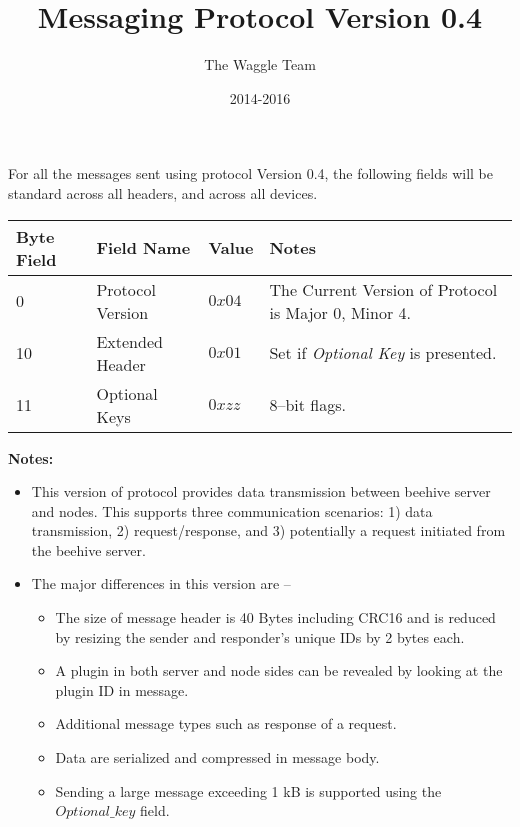 \documentclass[11pt,letter]{article}
\begin{document}
\title{Messaging Protocol Version 0.4}
\author{The Waggle Team}
\date{2014-2016}
\maketitle
\noindent
For all the messages sent using protocol Version 0.4, the following fields will be standard across
all headers, and across all devices.
\begin{center}
    \begin{tabular}{ | l | l | p{3cm} | p{5cm} |}
    \hline
    \hline
    \textbf{Byte Field} & \textbf{Field Name} & \textbf{Value} & \textbf{Notes} \\ \hline \hline
    0 & Protocol Version & $0x04$ & The Current Version of Protocol is Major 0, Minor 4. \\    \hline
    10 & Extended Header & $0x01$ & Set if \textit{Optional Key} is presented. \\    \hline
    11 & Optional Keys & $0xzz$ & 8--bit flags. \\    \hline
    \end{tabular}
\end{center}
\begin{framed}
\textbf{Notes:}
\\
\begin{itemize}
\item This version of protocol provides data transmission between beehive server and nodes. This supports three communication scenarios: 1) data transmission, 
2) request/response, and 3) potentially a request initiated from the beehive server.
\item The major differences in this version are --
\begin{itemize}
\item The size of message header is 40 Bytes including CRC16 and is reduced by resizing the sender and responder's unique IDs by 2 bytes each.
\item A plugin in both server and node sides can be revealed by looking at the plugin ID in message.
\item Additional message types such as response of a request.
\item Data are serialized and compressed in message body.
\item Sending a large message exceeding 1 kB is supported using the $Optional\_key$ field.
\end{itemize}
\end{itemize}
\end{framed}




\end{document}
